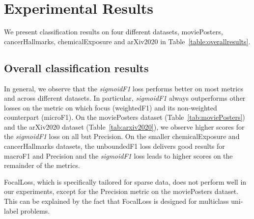 
\section{Experimental Results}
\label{sec:orgc23a664}

We present classification results on four different datasets, movie\-Posters, cancerHallmarks, chemicalExposure and arXiv2020 in Table~\ref{table:overallresults}.

\subsection{Overall classification results}

In general, we observe that the \emph{sigmoidF1} loss performs better on most metrics and across different datasets. In particular, \emph{sigmoidF1} always outperforms other losses on the metric on which focus (weightedF1) and its non-weighted counterpart (microF1).
On the moviePosters dataset (Table~\ref{tab:moviePosters}) and the arXiv2020 dataset (Table~\ref{tab:arxiv2020}), we observe higher scores for the \emph{sigmoidF1} loss on all but Precision.
On the smaller chemicalExposure and cancerHallmarks datasets, the unboundedF1 loss delivers good results for macroF1 and Precision and the \emph{sigmoidF1} loss leads to higher scores on the remainder of the metrics.



FocalLoss, which is specifically tailored for sparse data, does not perform well in our experiments, except for the Precision metric on the moviePosters dataset. This can be explained by the fact that FocalLoss is designed for multiclass uni-label problems.


